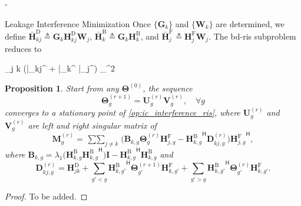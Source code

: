 \documentclass[journal]{IEEEtran}
\newtheorem{proposition}{Proposition}
\begin{document}
\begin{section}{-}
\begin{subsection}{Leakage Interference Minimization}
		Once $\{\mathbf{G}_k\}$ and $\{\mathbf{W}_k\}$ are determined, we define $\bar{\mathbf{H}}_{kj}^\mathrm{D} \triangleq \mathbf{G}_k \mathbf{H}_{kj}^\mathrm{D} \mathbf{W}_j$, $\bar{\mathbf{H}}_k^\mathrm{B} \triangleq \mathbf{G}_k \mathbf{H}_k^\mathrm{B}$, and $\bar{\mathbf{H}}_j^\mathrm{F} \triangleq \mathbf{H}_j^\mathrm{F} \mathbf{W}_j$.
		The \gls{bd}-\gls{ris} subproblem reduces to
		\begin{mini!}
			{\scriptstyle{\mathbf{\Theta}}}{\mathop{\sum\sum}_{j \neq k} \left\lVert (\bar{}_{kj}^ + \bar{}_k^ \mathbf{\Theta} \bar{}_j^) \right\rVert _{}^2}{\label{op:ic_interference_ris}}{}
		\end{mini!}

		\begin{proposition}
			Start from any $\mathbf{\Theta}^{(0)}$, the sequence
			\begin{equation}
				\mathbf{\Theta}_g^{(r+1)} = \mathbf{U}_g^{(r)} \mathbf{V}_g^{(r)}, \quad \forall g
			\end{equation}
			converges to a stationary point of \eqref{op:ic_interference_ris}, where $\mathbf{U}_g^{(r)}$ and $\mathbf{V}_g^{(r)}$ are left and right singular matrix of
			\begin{equation}
				\mathbf{M}_g^{(r)} = \mathop{\sum\sum}_{j \neq k} \bigl(\mathbf{B}_{k,g} \mathbf{\Theta}_g^{(r)} \mathbf{H}_{j,g}^\mathrm{F} - {\mathbf{H}_{k,g}^\mathrm{B}}^\mathsf{H} \mathbf{D}_{kj,g}^{(r)}\bigr) {\mathbf{H}_{j,g}^\mathrm{F}}^\mathsf{H},
			\end{equation}
			where $\mathbf{B}_{k,g} = \lambda_1\bigl(\mathbf{H}_{k,g}^\mathrm{B} {\mathbf{H}_{k,g}^\mathrm{B}}^\mathsf{H}\bigr) \mathbf{I} - {\mathbf{H}_{k,g}^\mathrm{B}}^\mathsf{H} \mathbf{H}_{k,g}^\mathrm{B}$ and
			\begin{equation}
				\mathbf{D}_{kj,g}^{(r)} = \mathbf{H}_{jk}^\mathrm{D} + \sum_{g'<g} {\mathbf{H}_{k,g'}^\mathrm{B}}^\mathsf{H} \mathbf{\Theta}_{g'}^{(r+1)} \mathbf{H}_{k,g'}^\mathrm{F} + \sum_{g'>g} {\mathbf{H}_{k,g'}^\mathrm{B}}^\mathsf{H} \mathbf{\Theta}_{g'}^{(r)} \mathbf{H}_{k,g'}^\mathrm{F}.
			\end{equation}
		\end{proposition}
		\begin{proof}
			To be added.
		\end{proof}


\end{subsection}
\end{section}
\end{document}
